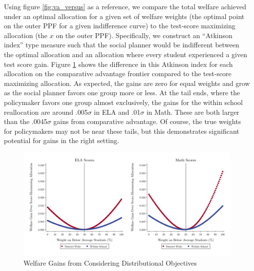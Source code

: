 \documentclass[12pt]{article}
\theoremstyle{definition}
\theoremstyle{definition}
\theoremstyle{definition}
\theoremstyle{definition}
\begin{document}


Using figure \ref{fig:va_versus} as a reference, we compare the total welfare achieved under an optimal allocation for a given set of welfare weights (the optimal point on the outer PPF for a given indifference curve) to the test-score maximizing allocation (the $x$ on the outer PPF). Specifically, we construct an ``Atkinson index'' type measure such that the social planner would be indifferent between the optimal allocation and an allocation where every student experienced a given test score gain. Figure \ref{fig:equity1a} shows the difference in this Atkinson index for each allocation on the comparative advantage frontier compared to the test-score maximizing allocation. As expected, the gains are zero for equal weights and grow as the social planner favors one group more or less. At the tail ends, where the policymaker favors one group almost exclusively, the gains for the within school reallocation are around .005$\sigma$ in ELA and .01$\sigma$ in Math. These are both larger than the .0045$\sigma$ gains from comparative advantage. Of course, the true weights for policymakers may not be near these tails, but this demonstrates significant potential for gains in the right setting.  

\begin{figure}[htpb]
\centering
\includegraphics[width=.9\textwidth]{Working_Paper/test_figures/A3_redist.pdf}
    \caption{Welfare Gains from Considering Distributional Objectives}
    \label{fig:equity1a}
\end{figure}
\end{document}
